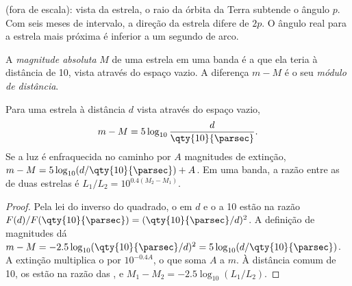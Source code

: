 \begin{omfigure}

{\small {} (fora de escala): vista da estrela, o raio da órbita da Terra subtende o ângulo $p$. Com seis meses de intervalo, a direção da estrela difere de $2p$. O ângulo real para a estrela mais próxima é inferior a um segundo de arco.}
\end{omfigure}

\begin{definition}\label{def:b1:observing-the-sky:absolute}
A \emph{magnitude absoluta} $M$ de uma estrela em uma banda é a  que ela teria à distância de \qty{10}{\parsec}, vista através do espaço vazio. A diferença $m - M$ é o seu \emph{módulo de distância}.
\end{definition}

\begin{proposition}\label{prop:b1:observing-the-sky:modulus}
Para uma estrela à distância $d$ vista através do espaço vazio,
\[
  m - M = 5\log_{10}\frac{d}{\qty{10}{\parsec}} .
\]
Se a luz é enfraquecida no caminho por $A$ magnitudes de extinção,
$m - M = 5\log_{10}(d/\qty{10}{\parsec}) + A$. Em uma banda, a razão entre as  de duas estrelas é $L_1/L_2 = 10^{0.4(M_2 - M_1)}$.
\end{proposition}

\begin{proof}
Pela lei do inverso do quadrado, o  em $d$ e o  a \qty{10}{\parsec} estão na razão $F(d)/F(\qty{10}{\parsec}) = (\qty{10}{\parsec}/d)^2$. A definição de magnitudes dá $m - M = -2.5\log_{10}(\qty{10}{\parsec}/d)^2
= 5\log_{10}(d/\qty{10}{\parsec})$. A extinção multiplica o  por $10^{-0.4A}$, o que soma $A$ a $m$. À distância comum de \qty{10}{\parsec}, os  estão na razão das , e $M_1 - M_2 = -2.5\log_{10}(L_1/L_2)$.
\end{proof}

